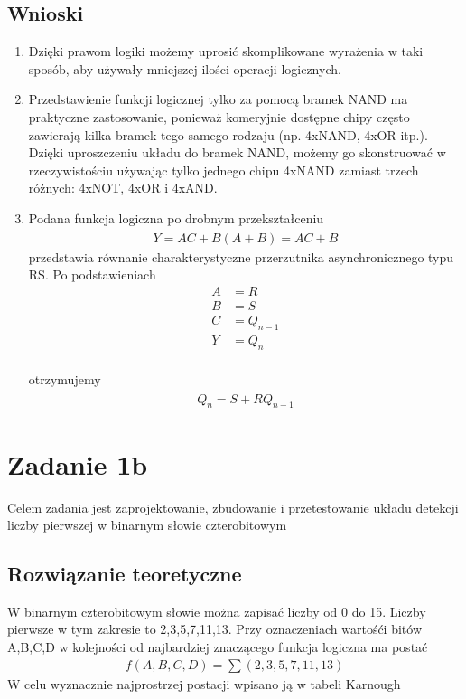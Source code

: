 \documentclass[12pt,a4paper,openright]{mwrep}
\begin{document}
\section{Wnioski}
\begin{enumerate}
    \item Dzięki prawom logiki możemy uprosić skomplikowane wyrażenia
    w taki sposób, aby używały mniejszej ilości operacji logicznych.
    \item Przedstawienie funkcji logicznej tylko za pomocą bramek NAND
    ma praktyczne zastosowanie, ponieważ komeryjnie dostępne chipy często
    zawierają kilka bramek tego samego rodzaju (np. 4xNAND, 4xOR itp.).
    Dzięki uproszczeniu układu do bramek NAND, możemy go skonstruować
    w rzeczywistościu używając tylko jednego chipu 4xNAND zamiast
    trzech różnych: 4xNOT, 4xOR i 4xAND.
    \item Podana funkcja logiczna po drobnym przekształceniu
    \begin{align*}
        Y = \overline{A}C + B(A + B) = \overline{A}C + B
    \end{align*}
    przedstawia równanie charakterystyczne przerzutnika 
    asynchronicznego typu RS. 
    Po podstawieniach
    \begin{align*}
        A &= R\\
        B &= S\\
        C &= Q_{n-1}\\
        Y &= Q_{n}\\
    \end{align*}
        
    otrzymujemy
    \begin{align*}
        Q_{n} = S + \overline{R}Q_{n-1}
    \end{align*}
\end{enumerate}
\chapter{Zadanie 1b}
Celem zadania jest zaprojektowanie, zbudowanie i przetestowanie 
układu detekcji liczby pierwszej w binarnym słowie czterobitowym
\section{Rozwiązanie teoretyczne}
W binarnym czterobitowym słowie można zapisać liczby od 0 do 15.
Liczby pierwsze w tym zakresie to 2,3,5,7,11,13.
Przy oznaczeniach wartośći bitów A,B,C,D w kolejności od najbardziej znaczącego funkcja logiczna ma postać
\begin{align*}
    f(A,B,C,D) = \sum(2,3,5,7,11,13)
\end{align*}
W celu wyznacznie najprostrzej postacji wpisano ją w tabeli Karnough
    
\end{document}
